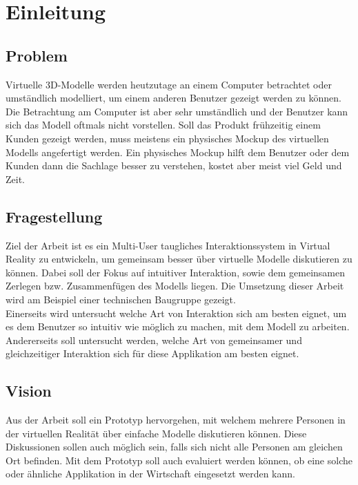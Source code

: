 \chapter{Einleitung}
\label{ch:Einleitung}

\section{Problem}

Virtuelle 3D-Modelle werden heutzutage an einem Computer betrachtet oder umständlich modelliert, um einem anderen Benutzer gezeigt werden zu können. Die Betrachtung am Computer ist aber sehr umständlich und der Benutzer kann sich das Modell oftmals nicht vorstellen. Soll das Produkt frühzeitig einem Kunden gezeigt werden, muss meistens ein physisches Mockup des virtuellen Modells angefertigt werden. Ein physisches Mockup hilft dem Benutzer oder dem Kunden dann die Sachlage besser zu verstehen, kostet aber meist viel Geld und Zeit.

\section{Fragestellung}

Ziel der Arbeit ist es ein Multi-User taugliches Interaktionssystem in Virtual Reality zu entwickeln, um gemeinsam besser über virtuelle Modelle diskutieren zu können. Dabei soll der Fokus auf intuitiver Interaktion, sowie dem gemeinsamen Zerlegen bzw. Zusammenfügen des Modells liegen. Die Umsetzung dieser Arbeit wird am Beispiel einer technischen Baugruppe gezeigt. \\

\noindent Einerseits wird untersucht welche Art von Interaktion sich am besten eignet, um es dem Benutzer so intuitiv wie möglich zu machen, mit dem Modell zu arbeiten. Andererseits soll untersucht werden, welche Art von gemeinsamer und gleichzeitiger Interaktion sich für diese Applikation am besten eignet.

\section{Vision}

Aus der Arbeit soll ein Prototyp hervorgehen, mit welchem mehrere Personen in der virtuellen Realität über einfache Modelle diskutieren können. Diese Diskussionen sollen auch möglich sein, falls sich nicht alle Personen am gleichen Ort befinden.
Mit dem Prototyp soll auch evaluiert werden können, ob eine solche oder ähnliche Applikation in der Wirtschaft eingesetzt werden kann. 